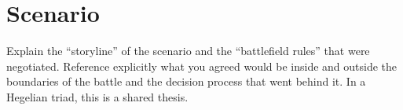 \section{Scenario}
Explain the “storyline” of the scenario and the “battlefield rules” that were negotiated. Reference explicitly what you agreed would be inside and outside the boundaries of the battle and the decision process that went behind it. In a Hegelian triad, this is a shared thesis.